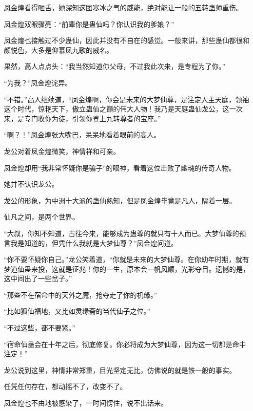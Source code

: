 \begin{this_body}
凤金煌看得咂舌，她深知这团寒冰之气的威能，绝对能让一般的五转蛊师重伤。

凤金煌双眼骤亮：“前辈你是蛊仙吗？你认识我的爹娘？”

凤金煌也接触过不少蛊仙，因此并没有不自在的感觉。一般来讲，那些蛊仙都很和颜悦色，大多是仰慕凤九歌的威名。

果然，高人点点头：“我当然知道你父母，不过我此次来，是专程为了你。”

“为我？”凤金煌诧异。

“不错。”高人继续道，“凤金煌啊，你会是未来的大梦仙尊，是注定入主天庭，领袖这个时代，惊艳天下，傲立蛊仙之巅的伟大人物！我乃是天庭蛊仙龙公，这一次来，是专门收你为徒，引领你登上九转尊者的宝座。”

“啊？！”凤金煌张大嘴巴，呆呆地看着眼前的高人。

龙公对着凤金煌微笑，神情祥和可亲。

凤金煌却用“我非常怀疑你是骗子”的眼神，看着这位击败了幽魂的传奇人物。

她并不认识龙公。

龙公的形象，为中洲十大派的蛊仙熟知，但是凤金煌毕竟是凡人，隔着一层。

仙凡之间，是两个世界。

“大叔，你知不知道，古往今来，能够成为蛊尊的就只有十人而已。大梦仙尊的预言我是知道的，但凭什么我就是大梦仙尊？”凤金煌问道。

“你不要怀疑你自己。”龙公笑着道，“你就是未来的大梦仙尊。在你幼年时期，就有梦道仙蛊来投，这就是征兆！你的一生，原本会一帆风顺，光彩夺目。遗憾的是，这中间出了一些岔子。”

“那些不在宿命中的天外之魔，抢夺走了你的机缘。”

“比如狐仙福地，又比如灵缘斋的当代仙子之位。”

“不过这些，都不要紧。”

“宿命仙蛊会在十年之后，彻底修复。你必将成为大梦仙尊，因为这一切都是命中注定！”

龙公说到这里，神情非常郑重，目光坚定无比，仿佛说的就是铁一般的事实。

任凭任何存在，都动摇不了，改变不了。

凤金煌也不由地被感染了，一时间愣住，说不出话来。

\end{this_body}

